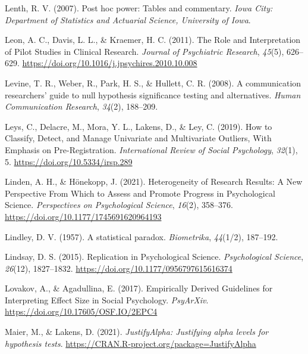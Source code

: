 \documentclass[
  oneside]{krantz}
\newlength{\cslhangindent}
\newlength{\cslentryspacingunit} %
\newenvironment{CSLReferences}[2] %
 {%
  \setlength{\parindent}{0pt}
  \ifodd #1
  \let\oldpar\par
  \def\par{\hangindent=\cslhangindent\oldpar}
  \fi
  \setlength{\parskip}{#2\cslentryspacingunit}
 }%
 {}
\begin{document}
\begin{CSLReferences}{1}{0}
\leavevmode{}%
Lenth, R. V. (2007). Post hoc power: Tables and commentary. \emph{Iowa
City: Department of Statistics and Actuarial Science, University of
Iowa}.

\leavevmode{}%
Leon, A. C., Davis, L. L., \& Kraemer, H. C. (2011). The {Role} and
{Interpretation} of {Pilot Studies} in {Clinical Research}.
\emph{Journal of Psychiatric Research}, \emph{45}(5), 626--629.
\url{https://doi.org/10.1016/j.jpsychires.2010.10.008}

\leavevmode{}%
Levine, T. R., Weber, R., Park, H. S., \& Hullett, C. R. (2008). A
communication researchers' guide to null hypothesis significance testing
and alternatives. \emph{Human Communication Research}, \emph{34}(2),
188--209.

\leavevmode{}%
Leys, C., Delacre, M., Mora, Y. L., Lakens, D., \& Ley, C. (2019). How
to {Classify}, {Detect}, and {Manage Univariate} and {Multivariate
Outliers}, {With Emphasis} on {Pre-Registration}. \emph{International
Review of Social Psychology}, \emph{32}(1), 5.
\url{https://doi.org/10.5334/irsp.289}

\leavevmode{}%
Linden, A. H., \& Hönekopp, J. (2021). Heterogeneity of {Research
Results}: {A New Perspective From Which} to {Assess} and {Promote
Progress} in {Psychological Science}. \emph{Perspectives on
Psychological Science}, \emph{16}(2), 358--376.
\url{https://doi.org/10.1177/1745691620964193}

\leavevmode{}%
Lindley, D. V. (1957). A statistical paradox. \emph{Biometrika},
\emph{44}(1/2), 187--192.

\leavevmode{}%
Lindsay, D. S. (2015). Replication in {Psychological Science}.
\emph{Psychological Science}, \emph{26}(12), 1827--1832.
\url{https://doi.org/10.1177/0956797615616374}

\leavevmode{}%
Lovakov, A., \& Agadullina, E. (2017). Empirically {Derived Guidelines}
for {Interpreting Effect Size} in {Social Psychology}. \emph{PsyArXiv}.
\url{https://doi.org/10.17605/OSF.IO/2EPC4}

\leavevmode{}%
Maier, M., \& Lakens, D. (2021). \emph{JustifyAlpha: Justifying alpha
levels for hypothesis tests}.
\url{https://CRAN.R-project.org/package=JustifyAlpha}


\end{CSLReferences}
\end{document}
